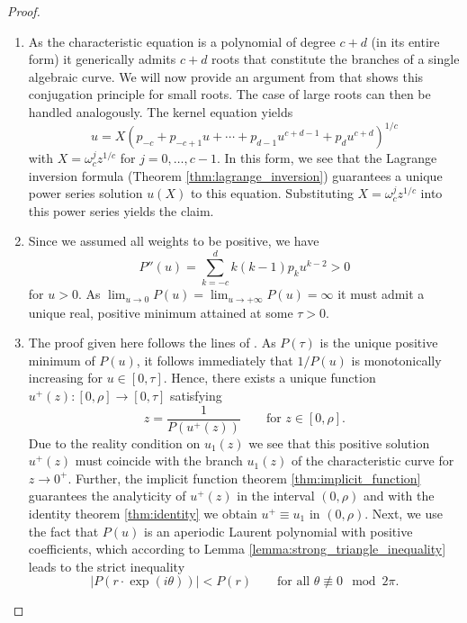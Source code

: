 \begin{proof}
  \phantom{}
  \begin{enumerate}
    \item As the characteristic equation is a polynomial of degree $c + d$ (in its entire form) it generically admits $c + d$ roots that constitute the branches of a single algebraic curve.
    We will now provide an argument from \cite[Proposition 6.9, p.~104]{Basketball} that shows this conjugation principle for small roots. The case of large roots can then be handled analogously.
    The kernel equation yields
    $$
      u = X(p_{-c} + p_{-c+1}u + \cdots + p_{d-1}u^{c+d-1} + p_d u^{c+d})^{1/c}
    $$
    with $X = \omega_c^j z^{1/c}$ for $j = 0,\dots, c - 1$. In this form, we see that the Lagrange inversion formula (Theorem \ref{thm:lagrange_inversion}) guarantees a unique power series solution $u(X)$ to this equation. Substituting $X = \omega_c^j z^{1/c}$ into this power series yields the claim.
    \item Since we assumed all weights to be positive, we have
    $$
      P''(u) = \sum_{k = -c}^d k(k - 1) p_k u^{k - 2} > 0
    $$
    for $u > 0$. As $\lim_{u \to 0} P(u) = \lim_{u \to + \infty} P(u) = \infty$ it must admit a unique real, positive minimum attained at some $\tau > 0$. 
    \item The proof given here follows the lines of \cite[Lemma 2, pp.~59--60]{Basic}. As $P(\tau)$ is the unique positive minimum of $P(u)$, it follows immediately that $1/P(u)$ is monotonically increasing for $u \in [0, \tau]$. 
    Hence, there exists a unique function $u^+(z): [0, \rho] \to [0,\tau]$ satisfying
    $$
      z = \frac{1}{P(u^+(z))} \qquad \text{for $z \in [0,\rho]$}.
    $$
    Due to the reality condition on $u_1(z)$ we see that this positive solution $u^+(z)$ must coincide with the branch $u_1(z)$ of the characteristic curve for $z \to 0^+$. 
    Further, the implicit function theorem \ref{thm:implicit_function} guarantees the analyticity of $u^+(z)$ in the interval $(0, \rho)$ and with the identity theorem \ref{thm:identity} we obtain $u^+ \equiv u_1$ in $(0, \rho)$. 
    Next, we use the fact that $P(u)$ is an aperiodic Laurent polynomial with positive coefficients, which according to Lemma \ref{lemma:strong_triangle_inequality} leads to the strict inequality
    \begin{equation}\label{eq:strong_triangle_inequality}
      |P(r \cdot \exp(i \theta))| < P(r) \qquad \text{for all $\theta \not\equiv 0 \mod 2\pi$}.
    \end{equation}

\end{enumerate}
\end{proof}
